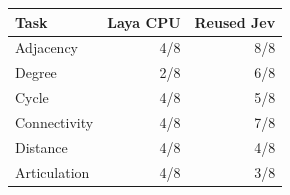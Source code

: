 \begin{tabular}{lrr}
\toprule
Task & Laya CPU & Reused Jev \\
\midrule
Adjacency & 4/8 & 8/8 \\
Degree & 2/8 & 6/8 \\
Cycle & 4/8 & 5/8 \\
Connectivity & 4/8 & 7/8 \\
Distance & 4/8 & 4/8 \\
Articulation & 4/8 & 3/8 \\
\bottomrule
\end{tabular}
